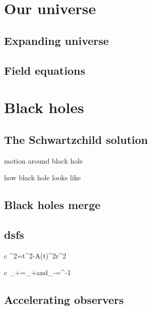 \documentclass[11pt,oneside%
]{memoir}
\newenvironment{eqna}{\begin{IEEEeqnarray*}{c}}{\end{IEEEeqnarray*}\ignorespacesafterend}
\newcommand{\andd}{\qquad\textrm{and}\qquad}
\newcommand{\dd}{\mathrm{d}}
\begin{document}



\chapter{Our universe}


\section{Expanding universe}


\section{Field equations}

\chapter{Black holes}

\section{The Schwartzchild solution}

motion around black hole

how black hole looks like

\section{Black holes merge}

\section{dsfs}

\begin{eqna}
\dd\tau^2=\dd t^2-A(t)^2\dd r^2
\end{eqna}

\begin{eqna}
\sigma_+\rightarrow\tilde{\sigma_+}=\eta\sigma_+\andd\sigma_-\rightarrow\tilde{\sigma_+}=\eta^{-1}\sigma
\end{eqna}

\section{Accelerating observers}
\end{document}
